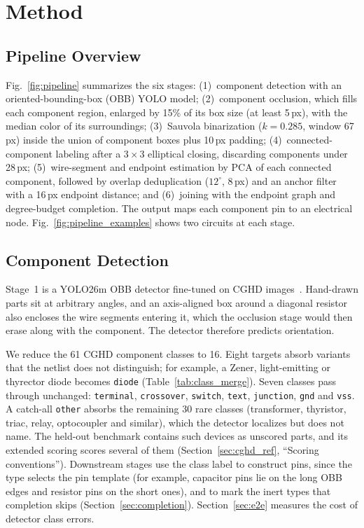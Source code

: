 \documentclass{ieeeaccess}
\begin{document}
\section{Method}
\label{sec:method}

\subsection{Pipeline Overview}

Fig.~\ref{fig:pipeline} summarizes the six stages: (1)~component detection with an oriented-bounding-box (OBB) YOLO model; (2)~component occlusion, which fills each component region, enlarged by 15\% of its box size (at least 5\,px), with the median color of its surroundings; (3)~Sauvola binarization ($k=0.285$, window 67\,px) inside the union of component boxes plus 10\,px padding; (4)~connected-component labeling after a $3\times3$ elliptical closing, discarding components under 28\,px; (5)~wire-segment and endpoint estimation by PCA of each connected component, followed by overlap deduplication ($12^{\circ}$, 8\,px) and an anchor filter with a 16\,px endpoint distance; and (6)~joining with the endpoint graph and degree-budget completion. The output maps each component pin to an electrical node. Fig.~\ref{fig:pipeline_examples} shows two circuits at each stage.

\subsection{Component Detection}
\label{sec:component_detection}

Stage~1 is a YOLO26m OBB detector fine-tuned on CGHD images~\cite{bayer2021cghd,cghd1152data}. Hand-drawn parts sit at arbitrary angles, and an axis-aligned box around a diagonal resistor also encloses the wire segments entering it, which the occlusion stage would then erase along with the component. The detector therefore predicts orientation.

We reduce the 61 CGHD component classes to 16. Eight targets absorb variants that the netlist does not distinguish; for example, a Zener, light-emitting or thyrector diode becomes \texttt{diode} (Table~\ref{tab:class_merge}). Seven classes pass through unchanged: \texttt{terminal}, \texttt{crossover}, \texttt{switch}, \texttt{text}, \texttt{junction}, \texttt{gnd} and \texttt{vss}. A catch-all \texttt{other} absorbs the remaining 30 rare classes (transformer, thyristor, triac, relay, optocoupler and similar), which the detector localizes but does not name. The held-out benchmark contains such devices as unscored parts, and its extended scoring scores several of them (Section~\ref{sec:cghd_ref}, ``Scoring conventions''). Downstream stages use the class label to construct pins, since the type selects the pin template (for example, capacitor pins lie on the long OBB edges and resistor pins on the short ones), and to mark the inert types that completion skips (Section~\ref{sec:completion}). Section~\ref{sec:e2e} measures the cost of detector class errors.
\end{document}
